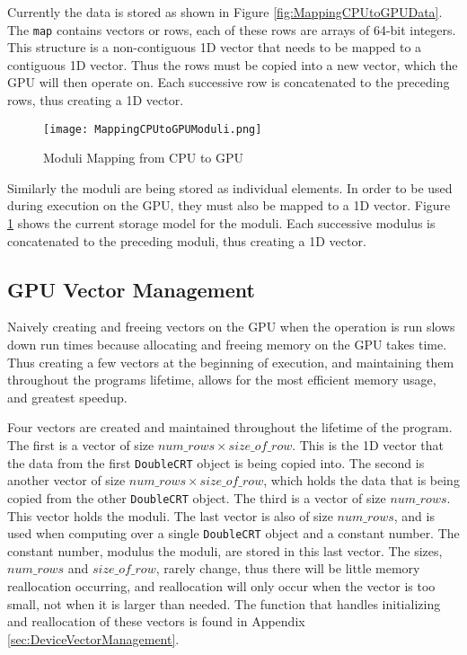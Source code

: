 Currently the data is stored as shown in Figure \ref{fig:MappingCPUtoGPUData}. The \verb|map| contains vectors or rows, each of these rows are arrays of 64-bit integers. This structure is a non-contiguous 1D vector that needs to be mapped to a contiguous 1D vector. Thus the rows must be copied into a new vector, which the GPU will then operate on. Each successive row is concatenated to the preceding rows, thus creating a 1D vector.

\begin{figure}[htp]
\centering
\texttt{[image: MappingCPUtoGPUModuli.png]}
\caption{Moduli Mapping from CPU to GPU}
\label{fig:MappingCPUtoGPUModuli}
\end{figure}

Similarly the moduli are being stored as individual elements. In order to be used during execution on the GPU, they must also be mapped to a 1D vector. Figure \ref{fig:MappingCPUtoGPUModuli} shows the current storage model for the moduli. Each successive modulus is concatenated to the preceding moduli, thus creating a 1D vector.

\subsection{GPU Vector Management}
Naively creating and freeing vectors on the GPU when the operation is run slows down run times because allocating and freeing memory on the GPU takes time. Thus creating a few vectors at the beginning of execution, and maintaining them throughout the programs lifetime, allows for the most efficient memory usage, and greatest speedup.

Four vectors are created and maintained throughout the lifetime of the program. The first is a vector of size $num\_rows \times size\_of\_row$. This is the 1D vector that the data from the first \verb|DoubleCRT| object is being copied into. The second is another vector of size $num\_rows \times size\_of\_row$, which holds the data that is being copied from the other \verb|DoubleCRT| object. The third is a vector of size $num\_rows$. This vector holds the moduli. The last vector is also of size $num\_rows$, and is used when computing over a single \verb|DoubleCRT| object and a constant number. The constant number, modulus the moduli, are stored in this last vector. The sizes, $num\_rows$ and $size\_of\_row$, rarely change, thus there will be little memory reallocation occurring, and reallocation will only occur when the vector is too small, not when it is larger than needed. The function that handles initializing and reallocation of these vectors is found in Appendix \ref{sec:DeviceVectorManagement}.

